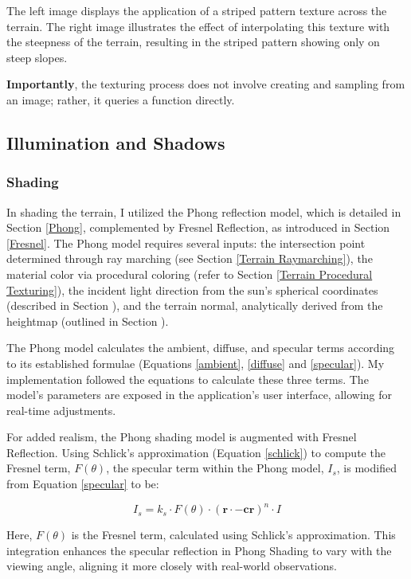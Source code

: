 {The left image displays the application of a striped pattern texture across the terrain. The right image illustrates the effect of interpolating this texture with the steepness of the terrain, resulting in the striped pattern showing only on steep slopes.}

\textbf{Importantly}, the texturing process does not involve creating and sampling from an image; rather, it queries a function directly.


\subsection{Illumination and Shadows}

\subsubsection{Shading}
\label{Terrain Shading}

In shading the terrain, I utilized the Phong reflection model, which is detailed in Section \ref{Phong}, complemented by Fresnel Reflection, as introduced in Section \ref{Fresnel}. The Phong model requires several inputs: the intersection point determined through ray marching (see Section \ref{Terrain Raymarching}), the material color via procedural coloring (refer to Section \ref{Terrain Procedural Texturing}), the incident light direction from the sun's spherical coordinates (described in Section ), and the terrain normal, analytically derived from the heightmap (outlined in Section ).

The Phong model calculates the ambient, diffuse, and specular terms according to its established formulae (Equations \ref{ambient}, \ref{diffuse} and \ref{specular}). My implementation followed the equations to calculate these three terms. The model's parameters are exposed in the application's user interface, allowing for real-time adjustments.

For added realism, the Phong shading model is augmented with Fresnel Reflection. Using Schlick's approximation (Equation \ref{schlick}) to compute the Fresnel term, $F(\theta)$, the specular term within the Phong model, $I_s$, is modified from Equation \ref{specular} to be:

\begin{equation}
I_{s} = k_s \cdot F(\theta) \cdot (\mathbf{r} \cdot \mathbf{-cr})^n \cdot I
\end{equation}

Here, $F(\theta)$ is the Fresnel term, calculated using Schlick's approximation. This integration enhances the specular reflection in Phong Shading to vary with the viewing angle, aligning it more closely with real-world observations.

